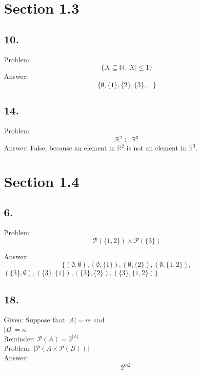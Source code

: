 \documentclass[12pt]{article}
\begin{document}
\begin{minipage}[t]{0.45\textwidth}
\section*{Section 1.3}
\subsection*{10.}
Problem: \[ \{X \subseteq \mathbb{N} : |X| \leq 1  \} \]
Answer: $$ \{\emptyset, \{1\}, \{2\}, \{3\},...\} $$

\subsection*{14.}
Problem: \[ \mathbb{R}^2 \subseteq \mathbb{R}^3\]
Answer: False, because an element in $ \mathbb{R}^2 $ is not an element in $ \mathbb{R}^3 $.
		
\section*{Section 1.4}
\subsection*{6.}
Problem: \[ \mathscr{P}(\{1,2\}) \times \mathscr{P}(\{3\}) \]

Answer: $$\{ (\emptyset,\emptyset), (\emptyset, \{1\}), (\emptyset,\{2\}), (\emptyset,\{1,2\}), $$
  $ (\{3\}, \emptyset), (\{3\}, \{1\}), (\{3\}, \{2\}), (\{3\}, \{1,2\})\}  $

\subsection*{18.}
Given: Suppose that $|A|=m$ and\\ $|B|=n$. \\
Reminder:  $ \mathscr{P}(A) = 2^{|A|} $ \\
Problem: $  |\mathscr{P}(A \times \mathscr{P}(B))| $ \\
Answer: $$  2^{m2^n} $$
\\ \\ \\ \\
\end{minipage}
\pagebreak
\end{document}
